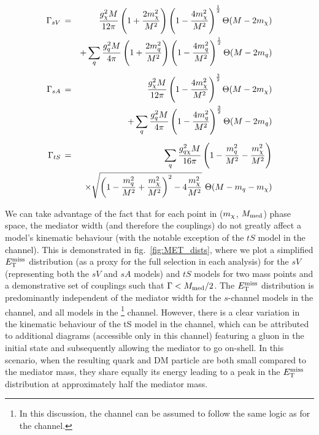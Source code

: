 \begin{eqnarray}
    \Gamma_{sV} \, &=& \,  \frac{g_{\chi}^2 M}{12\pi}\left(1 + \frac{2 m_{\chi}^{2}}{M^{2}}\right)\left(1 - \frac{4 m_{\chi}^{2}}{M^{2}}\right)^{\frac{1}{2}} \Theta(M-2 m_{\chi}) \nonumber\\
                  && + \sum_{\substack{q}}\frac{g_q^2M}{4\pi}\left(1 + \frac{2m_{q}^{2}}{M^{2}}\right)\left(1 - \frac{4m_{q}^{2}}{M^{2}}\right)^{\frac{1}{2}} \Theta(M-2m_q)\\[5pt]
    \Gamma_{sA} \, &=& \,  \frac{g_{\chi}^2 M}{12\pi}\left(1 - \frac{4 m_{\chi}^{2}}{M^{2}}\right)^{\frac{3}{2}} \Theta(M-2 m_{\chi}) \nonumber\\
                  && + \sum_{\substack{q}}\frac{g_q^2 M}{4\pi}\left(1 - \frac{4m_{q}^{2}}{M^{2}}\right)^{\frac{3}{2}} \Theta(M-2m_q) \\[5pt]
    \Gamma_{tS} \, &=& \,  \sum_{\substack{q}} \frac{g_{q \chi}^2M}{16\pi}\left(1 - \frac{m_{q}^{2}}{M^{2}} - \frac{m_{\chi}^{2}}{M^{2}}\right) \nonumber\\
                  && \times \sqrt{\left(1 - \frac{m_{q}^{2}}{M^{2}} + \frac{m_{\chi}^{2}}{M^{2}}\right)^{2} - 4\frac{m_{\chi}^{2}}{M^{2}}} \,\, \Theta(M-m_q- m_{\chi})
\end{eqnarray}

We can take advantage of the fact that for each point in ($m_{\chi}$, $M_{\mathrm{med}}$) phase space, the mediator width (and therefore the couplings) do not greatly affect a model's kinematic behaviour (with the notable exception of the $tS$ model in the \monojet channel). This is demonstrated in fig.~\ref{fig:MET_dists}, where we plot a simplified $E_{\mathrm{T}}^{\mathrm{miss}}$ distribution (as a proxy for the full selection in each analysis) for the $sV$ (representing both the $sV$ and $sA$ models) and $tS$ models for two mass points and a demonstrative set of couplings such that $\Gamma < M_{\mathrm{med}}/2$. The $E_{\mathrm{T}}^{\mathrm{miss}}$ distribution is predominantly independent of the mediator width for the $s$-channel models in the \monojet channel, and all models in the \monoZ\footnote{In this discussion, the \monoWZ channel can be assumed to follow the same logic as for the \monoZ channel.} channel. However, there is a clear variation in the kinematic behaviour of the tS model in the \monojet channel, which can be attributed to additional diagrams (accessible only in this channel) featuring a gluon in the initial state and subsequently allowing the mediator to go on-shell. In this scenario, when the resulting quark and DM particle are both small compared to the mediator mass, they share equally its energy leading to a peak in the $E_{\mathrm{T}}^{\mathrm{miss}}$ distribution at approximately half the mediator mass.

